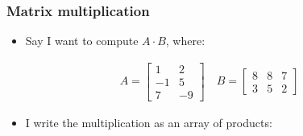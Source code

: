 \documentclass[handout]{beamer}
\numberwithin{equation}{section}
\begin{document}
\begin{frame}
\frametitle{Matrix multiplication}

\begin{itemize}
\item Say I want to compute $A \cdot B$, where: 
\end{itemize}

\pause \begin{align*}
A = \begin{bmatrix} 1 & 2 \\
-1 & 5 \\
7 & -9 \end{bmatrix} \quad 
B = \begin{bmatrix}
8 & 8 & 7 \\
3 & 5 & 2
\end{bmatrix}
\end{align*}


\pause \begin{itemize}
\item I write the multiplication as an array of products: 
\end{itemize}


\end{frame}
\end{document}
